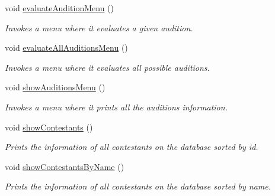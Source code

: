 \begin{DoxyCompactItemize}
\mbox{\label{class_company_m_s_a0b6d624aa19b526f0fea30152929d83c}} 
void \hyperlink{class_company_m_s_a0b6d624aa19b526f0fea30152929d83c}{evaluate\+Audition\+Menu} ()
\begin{DoxyCompactList}\small\item\em Invokes a menu where it evaluates a given audition. \end{DoxyCompactList}\item 
\mbox{\label{class_company_m_s_ab7dc4968bbdb3c4c9684b85519fbc77d}} 
void \hyperlink{class_company_m_s_ab7dc4968bbdb3c4c9684b85519fbc77d}{evaluate\+All\+Auditions\+Menu} ()
\begin{DoxyCompactList}\small\item\em Invokes a menu where it evaluates all possible auditions. \end{DoxyCompactList}\item 
\mbox{\label{class_company_m_s_ae07132a023117ea4e28e6ba1c8339731}} 
void \hyperlink{class_company_m_s_ae07132a023117ea4e28e6ba1c8339731}{show\+Auditions\+Menu} ()
\begin{DoxyCompactList}\small\item\em Invokes a menu where it prints all the auditions information. \end{DoxyCompactList}\item 
\mbox{\label{class_company_m_s_ac937fa14bf70bed40beced7502a5db21}} 
void \hyperlink{class_company_m_s_ac937fa14bf70bed40beced7502a5db21}{show\+Contestants} ()
\begin{DoxyCompactList}\small\item\em Prints the information of all contestants on the database sorted by id. \end{DoxyCompactList}\item 
\mbox{\label{class_company_m_s_ab419fdcc89990bb637240bf1598630a8}} 
void \hyperlink{class_company_m_s_ab419fdcc89990bb637240bf1598630a8}{show\+Contestants\+By\+Name} ()
\begin{DoxyCompactList}\small\item\em Prints the information of all contestants on the database sorted by name. \end{DoxyCompactList}\item 

\end{DoxyCompactItemize}
